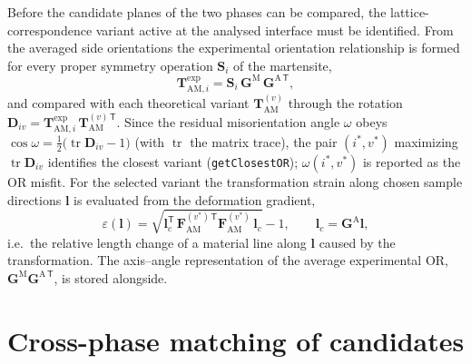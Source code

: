 \documentclass[11pt,a4paper]{article}
\newcommand{\mat}[1]{\mathbf{#1}}
\newcommand{\vc}[1]{\bm{#1}}
\newcommand{\trace}{\operatorname{tr}}
\begin{document}
Before the candidate planes of the two phases can be compared, the lattice-correspondence variant active at the analysed interface must be identified. From the averaged side orientations the experimental orientation relationship is formed for every proper symmetry operation $\mat S_i$ of the martensite,
\begin{equation}
\mat T^{\mathrm{exp}}_{\mathrm{AM},i}=\mat S_i\,\mat G^{\mathrm{M}}\,\mat G^{\mathrm{A}\,\mathsf T},
\label{eq:expOR}
\end{equation}
and compared with each theoretical variant $\mat T^{(v)}_{\mathrm{AM}}$ through the rotation $\mat D_{i v}=\mat T^{\mathrm{exp}}_{\mathrm{AM},i}\,\mat T^{(v)\,\mathsf T}_{\mathrm{AM}}$. Since the residual misorientation angle $\omega$ obeys $\cos\omega = \tfrac12\big(\trace \mat D_{iv}-1\big)$ (with $\trace$ the matrix trace), the pair $(i^\ast,v^\ast)$ maximizing $\trace\mat D_{iv}$ identifies the closest variant (\texttt{getClosestOR}); $\omega(i^\ast,v^\ast)$ is reported as the OR misfit. For the selected variant the transformation strain along chosen sample directions $\vc l$ is evaluated from the deformation gradient,
\begin{equation}
\varepsilon(\vc l)=\sqrt{\vc l_{c}^{\mathsf T}\,\mat F^{(v^\ast)\,\mathsf T}_{\mathrm{AM}}\mat F^{(v^\ast)}_{\mathrm{AM}}\,\vc l_{c}}-1,
\qquad \vc l_c=\mat G^{\mathrm{A}}\vc l ,
\label{eq:strain}
\end{equation}
i.e.\ the relative length change of a material line along $\vc l$ caused by the transformation. The axis--angle representation of the average experimental OR, $\mat G^{\mathrm{M}}\mat G^{\mathrm{A}\,\mathsf T}$, is stored alongside.

\section{Cross-phase matching of candidates}
\end{document}
